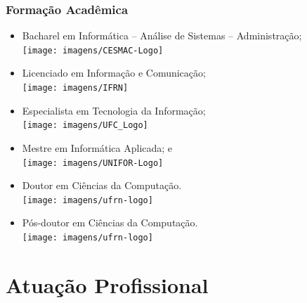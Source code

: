 \documentclass{beamer}
\begin{document}
\begin{frame}
	\frametitle{Formação Acadêmica}

	\begin{itemize}
		\item Bacharel em Informática -- Análise de Sistemas -- Administração;\\
		\texttt{[image: imagens/CESMAC-Logo]}
		
		\item Licenciado em Informa\c cão e Comunica\c cão;\\
		\texttt{[image: imagens/IFRN]}
		
		\item Especialista em Tecnologia da Informação;\\
		\texttt{[image: imagens/UFC\_Logo]}
		
		\item Mestre em Informática Aplicada; e\\
		\texttt{[image: imagens/UNIFOR-Logo]}
		
		\item Doutor em Ciências da Computação.\\
		\texttt{[image: imagens/ufrn-logo]}
		
		\item Pós-doutor em Ciências da Computação.\\
		\texttt{[image: imagens/ufrn-logo]}
	\end{itemize}
\end{frame}

\section{Atuação Profissional}
\end{document}
